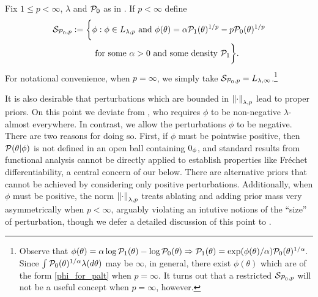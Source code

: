 \begin{defn}
%
Fix $1 \le p < \infty$, $\lambda$ and $\mathcal{P}_{0}$ as in .
If $p < \infty$ define
%
\begin{align*}
%
\pertset := \bigg\{&
    \phi:     \phi \in \lp{\lambda, p} \textrm{ and }
    \phi(\theta) = \alpha \palt(\theta)^{1/p} - p \pbase(\theta)^{1/p}\\&
    \textrm{ for some }\alpha > 0\textrm{ and some density }\palt
\bigg\}.
%
\end{align*}
%
For notational convenience, when $p = \infty$, we simply take $\mathcal{S}_{\mathcal{P}_{0},p} =
{L_{\lambda, \infty}}$.\footnote{
Observe that
%
%
$\phi(\theta) = \alpha \log \mathcal{P}_{1}(\theta) - \log \mathcal{P}_{0}(\theta) \Rightarrow
\mathcal{P}_{1}(\theta) = \exp(\phi(\theta) / \alpha) \mathcal{P}_{0}(\theta)^{1/\alpha}.$
%
%
Since $\int \mathcal{P}_{0}(\theta)^{1/\alpha} \lambda(d\theta)$ may be $\infty$, in
general, there exist $\phi(\theta)$ which are of the form \eqref{phi_for_palt}
when $p=\infty$.  It turns out that a restricted $\mathcal{S}_{\mathcal{P}_{0},p}$ will not be a useful
concept when $p=\infty$, however.}
%
\end{defn}


It is also desirable that perturbations which are bounded in
$\left\Vert\cdot\right\Vert_{\lambda,p}$ lead to proper priors.  On this point we deviate from
\citep{gustafson:1996:local}, who requires $\phi$ to be non-negative
$\lambda$-almost everywhere.  In contrast, we allow the perturbations $\phi$ to
be negative. There are two reasons for doing so.  First, if $\phi$ must be
pointwise positive, then $\mathcal{P}(\theta \vert \phi)$ is not defined in an open ball
containing $0_\phi$, and standard results from functional analysis cannot be
directly applied to establish properties like Fr{\'e}chet differentiability, a
central concern of our  below.  There are alternative
priors that cannot be achieved by considering only positive perturbations.
Additionally, when $\phi$ must be positive, the norm $\left\Vert\cdot\right\Vert_{\lambda, p}$
treats ablating and adding prior mass very asymmetrically when $p < \infty$,
arguably violating an intutive notions of the ``size'' of perturbation, though
we defer a detailed discussion of this point to .

